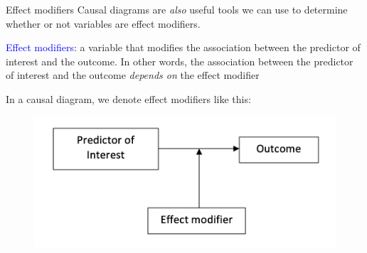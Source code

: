 \documentclass[10pt,t]{beamer}
\begin{document}
\begin{frame}{Effect modifiers}
Causal diagrams are \textit{also} useful tools we can use to determine whether or not variables are effect modifiers.

\vspace{0.3cm}

\textcolor{blue}{Effect modifiers}: a variable that modifies the association between the predictor of interest and the outcome. In other words, the association between the predictor of interest and the outcome \textit{depends on} the effect modifier \pause

\vspace{0.3cm}

In a causal diagram, we denote effect modifiers like this:

\vspace{0.1cm}

\begin{figure}
	\centering \includegraphics[scale=0.4]{effectmod1.png}
\end{figure}
\end{frame}
\end{document}
